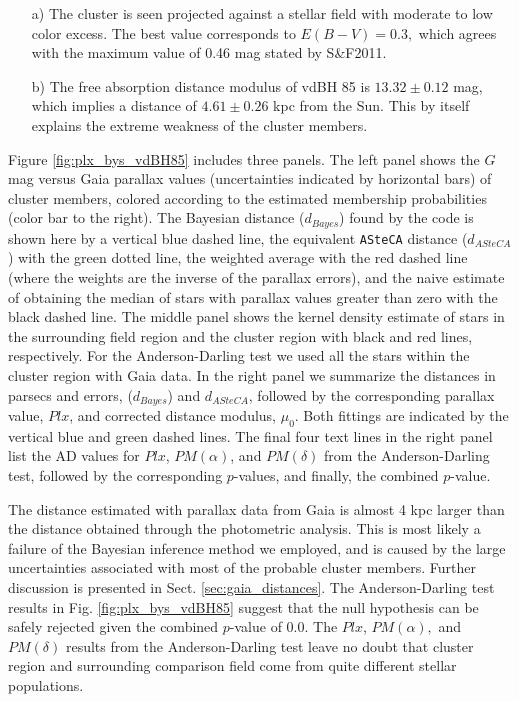 \documentclass[draft]{aa}
\begin{document}
\begin{itemize}
\item [a)] The cluster is seen projected against a stellar field with moderate
    to low color excess. The best value corresponds to $E(B-V)=0.3,$ which
    agrees with the maximum value of 0.46 mag stated by S\&F2011.
\item [b)] The free absorption distance modulus of vdBH 85 is
    $13.32\pm0.12$ mag, which implies a distance of $4.61\pm0.26$ kpc
    from the Sun.  This by itself explains the extreme weakness of the
    cluster members.
\end{itemize}

Figure \ref{fig:plx_bys_vdBH85} includes three panels. The
left panel shows the $G$ mag versus Gaia parallax values (uncertainties indicated by
horizontal bars) of cluster members, colored according to the estimated
membership probabilities (color bar to the right).
%
The Bayesian distance ($d_{Bayes}$) found by the code is shown here by
a vertical blue dashed line, the equivalent \texttt{ASteCA} distance
($d_{ASteCA}$) with the green dotted line, the weighted average with the red dashed
line (where the weights are the inverse of the parallax
errors), and the naive estimate of obtaining the median of stars with
parallax values greater than zero with the black dashed line.
%
The middle panel shows the kernel density estimate of stars in the surrounding
field region and the cluster region with black and red lines, respectively. For
the Anderson-Darling test we used all the stars within the cluster region with
Gaia data. In the right panel we summarize the distances in parsecs and errors,
($d_{Bayes}$) and $d_{ASteCA}$, followed by the corresponding parallax
value, $Plx$, and corrected distance modulus, $\mu_0$. Both fittings are
indicated by the vertical blue and green dashed lines. The final
four text lines in the right panel list the AD values for $Plx$, $PM(\alpha)$, and
$PM(\delta)$ from the Anderson-Darling test, followed by the corresponding
$p$-values, and finally, the combined $p$-value.

The distance estimated with parallax data from Gaia is almost 4 kpc
larger than the distance obtained through the photometric analysis. This is most
likely a failure of the Bayesian inference method we employed, and is caused by the large
uncertainties associated with most of the probable cluster members. Further
discussion is presented in Sect. \ref{sec:gaia_distances}.
%
The Anderson-Darling test results in Fig. \ref{fig:plx_bys_vdBH85} suggest that the
null hypothesis can be safely rejected given the combined $p$-value of
0.0. The $Plx$, $PM(\alpha),$ and $PM(\delta)$ results from the
Anderson-Darling test leave no doubt that cluster region and surrounding comparison field come from quite different stellar populations.\\
\end{document}
